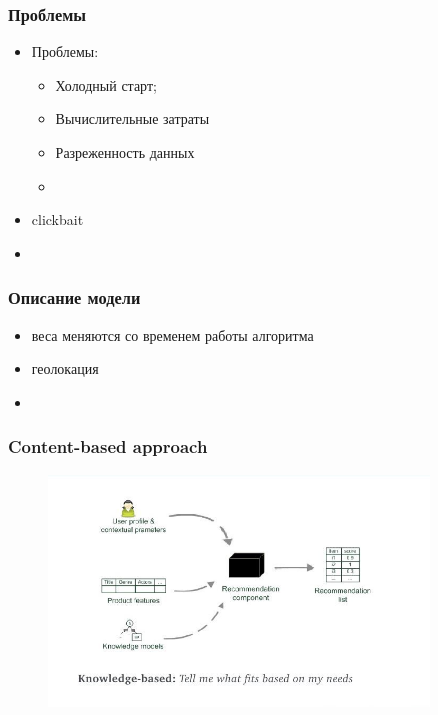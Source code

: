 \documentclass[xetex,mathserif,serif]{beamer}
\begin{document}
\begin{frame}
	\frametitle{Проблемы}

	\begin{itemize}
		\item Проблемы:
		      \begin{itemize}
			      \item Холодный старт;
			      \item Вычислительные затраты
			      \item Разреженность данных
			      \item 
		      \end{itemize}
		\item clickbait
		\item 
	\end{itemize}
\end{frame}


\begin{frame}
	\frametitle{Описание модели}

	\begin{itemize}
		\item веса меняются со временем работы алгоритма
		\item геолокация
		\item 
	\end{itemize}
\end{frame}

\begin{frame}
	\frametitle{Content-based approach}

	\begin{figure}[h]
		\includegraphics[width=0.9\textwidth]{./images/content_based.jpeg}
		\centering
	\end{figure}
\end{frame}
\end{document}
